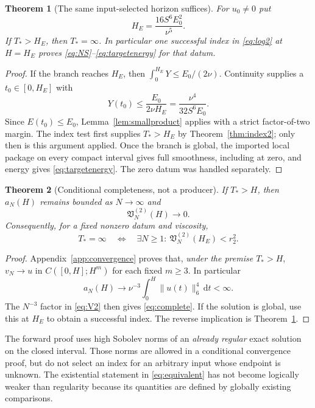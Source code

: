 \documentclass[11pt,a4paper]{article}
\newtheorem{theorem}{Theorem}[section]
\theoremstyle{definition}\newtheorem{definition}[theorem]{Definition}
\theoremstyle{remark}\newtheorem{remark}[theorem]{Remark}
\newcommand{\dd}{\,\mathrm d}
\newcommand{\norm}[1]{\lVert #1\rVert}
\numberwithin{equation}{section}
\begin{document}
\begin{theorem}[The same input-selected horizon suffices]\label{thm:horizon}
For $u_0\ne0$ put
\begin{equation}\label{eq:HE}
 H_E=\frac{16S^6E_0^2}{\nu^5}.
\end{equation}
If $T_*>H_E$, then $T_*=\infty$. In particular one successful index in \eqref{eq:log2} at $H=H_E$ proves \eqref{eq:NS}--\eqref{eq:targetenergy} for that datum.
\end{theorem}
\begin{proof}
If the branch reaches $H_E$, then $\int_0^{H_E}Y\le E_0/(2\nu)$. Continuity supplies a $t_0\in[0,H_E]$ with
\[
 Y(t_0)\le\frac{E_0}{2\nu H_E}=\frac{\nu^4}{32S^6E_0}.
\]
Since $E(t_0)\le E_0$, Lemma~\ref{lem:smallproduct} applies with a strict factor-of-two margin. The index test first supplies $T_*>H_E$ by Theorem~\ref{thm:index2}; only then is this argument applied. Once the branch is global, the imported local package on every compact interval gives full smoothness, including at zero, and energy gives \eqref{eq:targetenergy}. The zero datum was handled separately.
\end{proof}

\begin{theorem}[Conditional completeness, not a producer]\label{thm:complete}
If $T_*>H$, then $a_N(H)$ remains bounded as $N\to\infty$ and
\begin{equation}\label{eq:complete}
 \mathfrak V_N^{(2)}(H)\longrightarrow0.
\end{equation}
Consequently, for a fixed nonzero datum and viscosity,
\begin{equation}\label{eq:equivalent}
 T_*=\infty\quad\Longleftrightarrow\quad
 \exists N\ge1:\ \mathfrak V_N^{(2)}(H_E)<r_2^2.
\end{equation}
\end{theorem}
\begin{proof}
Appendix~\ref{app:convergence} proves that, \emph{under the premise $T_*>H$}, $v_N\to u$ in $C([0,H];H^m)$ for each fixed $m\ge3$. In particular
\[
 a_N(H)\longrightarrow\nu^{-3}\int_0^H\norm{u(t)}_6^4\dd t<\infty.
\]
The $N^{-3}$ factor in \eqref{eq:V2} then gives \eqref{eq:complete}. If the solution is global, use this at $H_E$ to obtain a successful index. The reverse implication is Theorem~\ref{thm:horizon}.
\end{proof}

The forward proof uses high Sobolev norms of an \emph{already regular} exact solution on the closed interval. Those norms are allowed in a conditional convergence proof, but do not select an index for an arbitrary input whose endpoint is unknown. The existential statement in \eqref{eq:equivalent} has not become logically weaker than regularity because its quantities are defined by globally existing comparisons.
\end{document}
